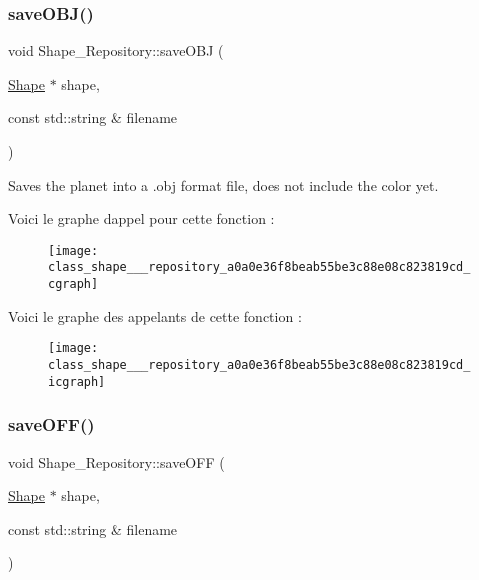 \subsubsection{\texorpdfstring{save\+O\+B\+J()}{saveOBJ()}}
{\footnotesize\ttfamily void Shape\+\_\+\+Repository\+::save\+O\+BJ (\begin{DoxyParamCaption}\item[{\hyperlink{class_shape}{Shape} $\ast$}]{shape,  }\item[{const std\+::string \&}]{filename }\end{DoxyParamCaption})\hspace{0.3cm}{\ttfamily [static]}}



Saves the planet into a .obj format file, does not include the color yet. 

Voici le graphe d\textquotesingle{}appel pour cette fonction \+:\nopagebreak
\begin{figure}[H]
\begin{center}
\leavevmode
\texttt{[image: class\_shape\_\_\_repository\_a0a0e36f8beab55be3c88e08c823819cd\_cgraph]}
\end{center}
\end{figure}
Voici le graphe des appelants de cette fonction \+:\nopagebreak
\begin{figure}[H]
\begin{center}
\leavevmode
\texttt{[image: class\_shape\_\_\_repository\_a0a0e36f8beab55be3c88e08c823819cd\_icgraph]}
\end{center}
\end{figure}
\mbox{\label{class_shape___repository_ad52141b6883d20084a0105355f2271b5}} 
\subsubsection{\texorpdfstring{save\+O\+F\+F()}{saveOFF()}}
{\footnotesize\ttfamily void Shape\+\_\+\+Repository\+::save\+O\+FF (\begin{DoxyParamCaption}\item[{\hyperlink{class_shape}{Shape} $\ast$}]{shape,  }\item[{const std\+::string \&}]{filename }\end{DoxyParamCaption})\hspace{0.3cm}{\ttfamily [static]}}



